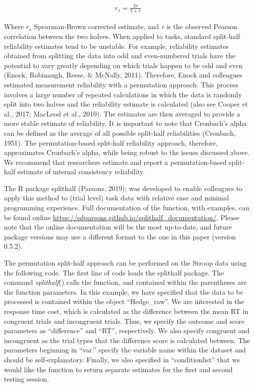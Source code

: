 \documentclass[english,,man,floatsintext]{apa6}
\begin{document}
\begin{align}
r_s=\frac{2r}{1 + r}
\end{align}

Where \(r_s\) Spearman-Brown corrected estimate, and \emph{r} is the observed Pearson correlation between the two halves. When applied to tasks, standard split-half reliability estimates tend to be unstable. For example, reliability estimates obtained from splitting the data into odd and even-numbered trials have the potential to vary greatly depending on which trials happen to be odd and even (Enock, Robinaugh, Reese, \& McNally, 2011). Therefore, Enock and colleagues estimated measurement reliability with a permutation approach. This process involves a large number of repeated calculations in which the data is randomly split into two halves and the reliability estimate is calculated (also see Cooper et al., 2017; MacLeod et al., 2010). The estimates are then averaged to provide a more stable estimate of reliability. It is important to note that Cronbach's alpha can be defined as the average of all possible split-half reliabilities (Cronbach, 1951). The permutation-based split-half reliability approach, therefore, approximates Cronbach's alpha, while being robust to the issues discussed above. We recommend that researchers estimate and report a permutation-based split-half estimate of internal consistency reliability.

The R package splithalf (Parsons, 2019); was developed to enable colleagues to apply this method to (trial level) task data with relative ease and minimal programming experience. Full documentation of the function, with examples, can be found online \url{https://sdparsons.github.io/splithalf_documentation/}. Please note that the online documentation will be the most up-to-date, and future package versions may use a different format to the one in this paper (version 0.5.2).

The permutation split-half approach can be performed on the Stroop data using the following code. The first line of code loads the splithalf package. The command \emph{splithalf}() calls the function, and contained within the parentheses are the function parameters. In this example, we have specified that the data to be processed is contained within the object \enquote{Hedge\_raw}. We are interested in the response time cost, which is calculated as the difference between the mean RT in congruent trials and incongruent trials. Thus, we specify the outcome and score parameters as \enquote{difference} and \enquote{RT}, respectively. We also specify congruent and incongruent as the trial types that the difference score is calculated between. The parameters beginning in \enquote{var.} specify the variable name within the dataset and should be self-explanatory. Finally, we also specified in \enquote{conditionlist} that we would like the function to return separate estimates for the first and second testing session.
\end{document}
